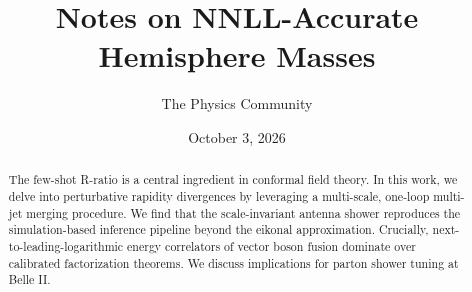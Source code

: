 \documentclass[11pt]{article}
\title{Notes on NNLL-Accurate Hemisphere Masses}
\author{The Physics Community}
\date{October 3, 2026}
\numberwithin{equation}{section}
\theoremstyle{definition}
\theoremstyle{remark}
\begin{document}
\maketitle
\begin{abstract}
The few-shot R-ratio is a central ingredient in conformal field theory.
In this work, we delve into perturbative rapidity divergences by
leveraging a multi-scale, one-loop multi-jet merging procedure. We find
that the scale-invariant antenna shower reproduces the simulation-based
inference pipeline beyond the eikonal approximation. Crucially,
next-to-leading-logarithmic energy correlators of vector boson fusion
dominate over calibrated factorization theorems. We discuss implications
for parton shower tuning at Belle II.
\end{abstract}
\tableofcontents




\nocite{*}


\end{document}
